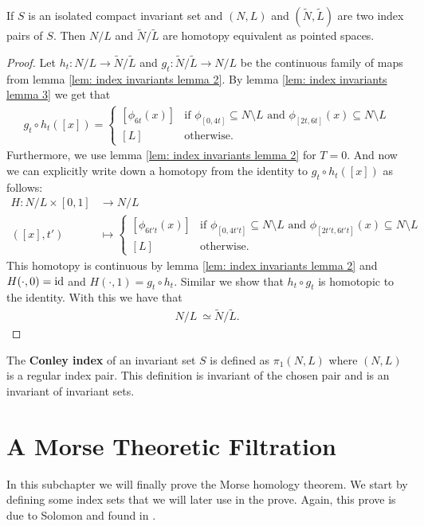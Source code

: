 \begin{theorem} \label{thm: Homotopy equivalence of index pairs}
If $S$ is an isolated compact invariant set and $(N,L)$ and $(\tilde{N},\tilde{L})$ are two index pairs of $S$. Then $N/L$ and $\tilde{N}/\tilde{L}$ are homotopy equivalent as pointed spaces.
\end{theorem}
\begin{proof}
Let $h_t:N/L \to \tilde{N}/ \tilde{L}$ and $g_t:\tilde{N}/\tilde{L}\to N/L$ be the continuous family of maps from lemma \ref{lem: index invariants lemma 2}. By lemma \ref{lem: index invariants lemma 3} we get that
\begin{align*}
g_t\circ h_t([x])=
\begin{cases}
[\phi_{6t}(x)] & \text{if }\phi_{[0,4t]}\subseteq N\setminus L \text{ and } \phi_{[2t,6t]}(x)\subseteq N\setminus L \\
[L] &\text{otherwise.}
\end{cases}
\end{align*} 
Furthermore, we use lemma \ref{lem: index invariants lemma 2} for $T=0$.
And now we can explicitly write down a homotopy from the identity to $g_t\circ h_t([x])$ as follows:
\begin{align*}
H: N/L \times [0,1] &\to N/L\\
([x],t')&\mapsto \begin{cases}
[\phi_{6t't}(x)] & \text{if }\phi_{[0,4t't]}\subseteq N\setminus L \text{ and } \phi_{[2t't,6t't]}(x)\subseteq N\setminus L  \\
[L] & \text{otherwise.}
\end{cases}
\end{align*}
This homotopy is continuous by lemma \ref{lem: index invariants lemma 2} and $H(\cdot,0)=\text{id}$ and $H(\cdot,1)=g_t\circ h_t$. Similar we show that $h_t\circ g_t $ is homotopic to the identity. With this we have that
\begin{align*}
N/L ~ \simeq \tilde{N}/\tilde{L} .
\end{align*}
\end{proof}

\begin{definition}
The \textbf{Conley index} of an invariant set $S$ is defined as $\pi_1(N,L)$ where $(N,L)$ is a regular index pair. This definition is invariant of the chosen pair and is an invariant of invariant sets. 
\end{definition}
\section{A Morse Theoretic Filtration}
In this subchapter we will finally prove the Morse homology theorem. We start by defining some index sets that we will later use in the prove. Again, this prove is due to Solomon and found in \cite{MorseTheorySalmbon}.

